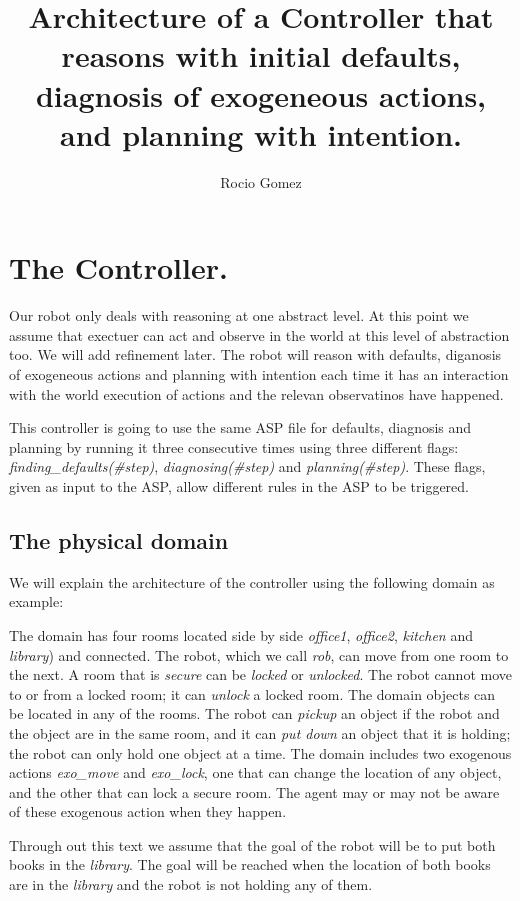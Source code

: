 \documentclass[11pt, oneside]{article}
\title{Architecture of a Controller that reasons with initial defaults, diagnosis of exogeneous actions, and planning with intention.}
\author{Rocio Gomez}
\begin{document}
\maketitle

\section{The Controller.}

Our robot only deals with reasoning at one abstract level. At this point we assume that exectuer can act and observe in the world at this level of abstraction too. We will add refinement later. The robot will reason with defaults, diganosis of exogeneous actions and planning with intention each time it has an interaction with the world execution of actions and the relevan observatinos have happened. 

This controller is going to use the same ASP file for defaults, diagnosis and planning by running it three consecutive times using three different flags: \emph{finding\_defaults(#step)}, \emph{diagnosing(#step)} and \emph{planning(#step)}. These flags, given as input to the ASP, allow different rules in the ASP to be triggered.

\subsection{The physical domain}
We will explain the architecture of the controller using the following domain as example:

The domain has four rooms located side by side \emph{office1}, \emph{office2}, \emph{kitchen} and
\emph{library}) and connected. The robot, which we call \emph{rob}, can move from one room to the next. A room that is \emph{secure} can
be \emph{locked} or \emph{unlocked}. The robot cannot move to or from a locked room; it can \emph{unlock} a locked room. The domain objects
can be located in any of the rooms. The robot can \emph{pickup} an object if the robot and the object are in the same room, and it can
\emph{put down} an object that it is holding; the robot can only hold one object at a time. The domain includes two exogenous actions 
\emph{exo\_move} and \emph{exo\_lock}, one that can change the location of any object, and the other that can lock a secure room. The agent may or may not be aware of these exogenous action when they happen. 

Through out this text we assume that the goal of the robot will be to put both books in the \emph{library}. The goal will be reached when the location of both books are in the \emph{library} and the robot is not holding any of them. 
\end{document}
